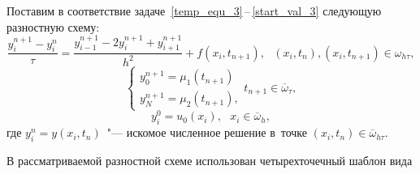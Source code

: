 \documentclass[11pt,a4paper,twoside,listtotoc,bibtotoc]{report}
\numberwithin{equation}{section}
\theoremstyle{definition}
\theoremstyle{plain}
\begin{document}
Поставим в соответствие задаче~\eqref{temp_equ_3}\,--\,\eqref{start_val_3}
следующую разностную схему:
%
\begin{equation}
%
    \label{diskr_temp_equ_2-2}
    \frac{y_i^{n+1} - y_i^n}{\tau} = \frac{y_{i-1}^{n+1} - 2y_i^{n+1} + y_{i+1}^{n+1}}{h^2}
    + f(x_i,t_{n+1}),~~~(x_i, t_n), (x_i, t_{n+1})\in \omega_{h\tau},
%
\end{equation}
%
%
\begin{equation}
%
    \label{bord_diskr_2-2}
    \begin{cases}
        y_0^{n+1} = \mu_1(t_{n+1}) \\
        y_N^{n+1} = \mu_2(t_{n+1}),
    \end{cases}
    t_{n+1}\in \overline{\omega}_{\tau},
%
\end{equation}
%
%
\begin{equation}
%
    \label{start_diskr_2-2}
    y_i^0 = u_0(x_i),~~~x_i\in \overline{\omega}_h,
%
\end{equation}
%
где $y_i^n = y(x_i, t_n)$~"--- искомое численное решение
в~точке $(x_i, t_n) \in \overline{\omega}_{h\tau}$.

В рассматриваемой разностной схеме использован четырехточечный шаблон вида
\end{document}
